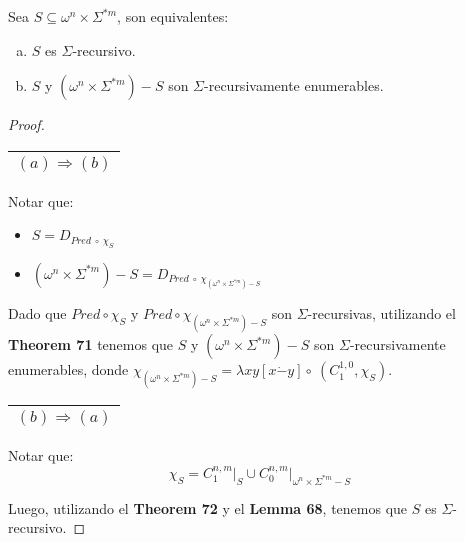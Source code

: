   \begin{theorem}
    \PN Sea $S \subseteq \omega^{n} \times \Sigma^{\ast m}$, son equivalentes:
    \begin{enumerate}[a)]
      \item $S$ es $\Sigma$-recursivo.
      \item $S$ y $(\omega^{n} \times \Sigma^{\ast m}) - S$ son $\Sigma$-recursivamente enumerables.
    \end{enumerate}
  \end{theorem}
  \begin{proof}
    \begin{tabular}{|c|} \hline $(a) \Rightarrow (b)$ \\\hline \end{tabular}

    \PN Notar que:
    \begin{itemize}
      \item $S = D_{Pred\ \circ\ \chi_{S}}$
      \item $(\omega^{n} \times \Sigma^{\ast m}) - S = D_{Pred\ \circ\ \chi_{(\omega^{n} \times \Sigma^{\ast m})-S}}$
    \end{itemize}

    \PN Dado que $Pred \circ \chi_{S}$ y $Pred \circ \chi_{(\omega^{n} \times \Sigma^{\ast m})-S}$ son
    $\Sigma$-recursivas, utilizando el \textbf{Theorem 71} tenemos que $S$ y $(\omega^{n} \times \Sigma^{\ast m}) - S$
    son $\Sigma$-recursivamente enumerables, donde $\chi_{(\omega^{n} \times \Sigma^{\ast m}) - S} = \lambda xy \left[x
    \dot{-}y\right] \circ\ (C_{1}^{1,0},\chi_S)$.

    \vspace{3mm}
    \PN \begin{tabular}{|c|} \hline $(b) \Rightarrow (a)$ \\\hline \end{tabular}
    \vspace{3mm}
    \PN Notar que:
    \[
      \chi_{S} = C_{1}^{n,m}\mathrm{\mid}_{S} \cup C_{0}^{n,m}\mathrm{\mid}_{\omega^{n} \times \Sigma^{\ast m} - S}
    \]

    \PN Luego, utilizando el \textbf{Theorem 72} y el \textbf{Lemma 68}, tenemos que $S$ es $\Sigma$-recursivo.
  \end{proof}


